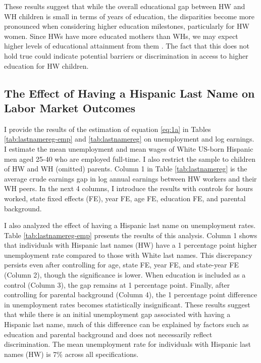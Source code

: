 These results suggest that while the overall educational gap between HW and WH children is small in terms of years of education, the disparities become more pronounced when considering higher education milestones, particularly for HW women. Since HWs have more educated mothers than WHs, we may expect higher levels of educational attainment from them \autocite{kimball2009risk, gould2020does}. The fact that this does not hold true could indicate potential barriers or discrimination in access to higher education for HW children.

\subsection{The Effect of Having a Hispanic Last Name on Labor Market Outcomes}

I provide the results of the estimation of equation \ref{eq:1a} in Tables \ref{tab:lastnamereg-emp} and \ref{tab:lastnamereg} on unemployment and log earnings. I estimate the mean unemployment and mean wages of White US-born Hispanic men aged 25-40 who are employed full-time. I also restrict the sample to children of HW and WH (omitted) parents.  Column 1 in Table \ref{tab:lastnamereg} is the average crude earnings gap in log annual earnings between HW workers and their WH peers. In the next 4 columns, I introduce the results with controls for hours worked, state fixed effects (FE), year FE, age FE, education FE, and parental background.

I also analyzed the effect of having a Hispanic last name on unemployment rates. Table \ref{tab:lastnamereg-emp} presents the results of this analysis. Column 1 shows that individuals with Hispanic last names (HW) have a 1 percentage point higher unemployment rate compared to those with White last names. This discrepancy persists even after controlling for age, state FE, year FE, and state-year FE (Column 2), though the significance is lower. When education is included as a control (Column 3), the gap remains at 1 percentage point. Finally, after controlling for parental background (Column 4), the 1 percentage point difference in unemployment rates becomes statistically insignificant. These results suggest that while there is an initial unemployment gap associated with having a Hispanic last name, much of this difference can be explained by factors such as education and parental background and does not necessarily reflect discrimination. The mean unemployment rate for individuals with Hispanic last names (HW) is 7\% across all specifications.

